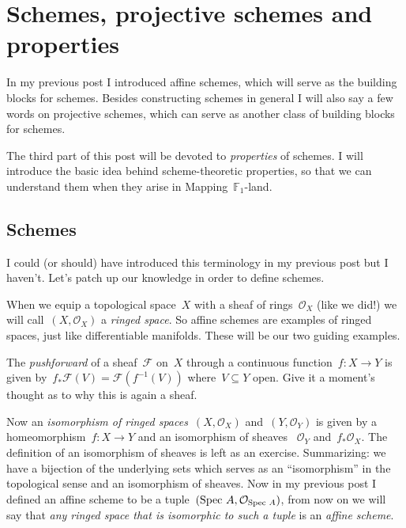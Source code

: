 \section{Schemes, projective schemes and properties}

In my previous post I introduced affine schemes, which will serve as the building blocks for schemes. Besides constructing schemes in general I will also say a few words on projective schemes, which can serve as another class of building blocks for schemes.

The third part of this post will be devoted to \emph{properties} of schemes. I will introduce the basic idea behind scheme-theoretic properties, so that we can understand them when they arise in \iftex\cite{mapping-fun}\fi\ifblog Mapping~$\mathbb{F}_1$-land\fi.

\subsection{Schemes}
I could (or should) have introduced this terminology in my previous post but I haven't. Let's patch up our knowledge in order to define schemes.

\begin{definition}
  When we equip a topological space~$X$ with a sheaf of rings~$\mathcal{O}_X$ (like we did!) we will call~$(X,\mathcal{O}_X)$ a \emph{ringed space}. So affine schemes are examples of ringed spaces, just like differentiable manifolds. These will be our two guiding examples.
\end{definition}

\begin{definition}
  The \emph{pushforward} of a sheaf~$\mathcal{F}$ on~$X$ through a continuous function~$f\colon X\to Y$ is given by~$f_\ast\mathcal{F}(V)=\mathcal{F}(f^{-1}(V))$ where~$V\subseteq Y$ open. Give it a moment's thought as to why this is again a sheaf.
\end{definition}

\begin{definition}
  Now an \emph{isomorphism of ringed spaces}~$(X,\mathcal{O}_X)$ and~$(Y,\mathcal{O}_Y)$ is given by a homeomorphism~$f\colon X\to Y$ and an isomorphism of sheaves ~$\mathcal{O}_Y$ and~$f_\ast\mathcal{O}_X$. The definition of an isomorphism of sheaves is left as an exercise. Summarizing: we have a bijection of the underlying sets which serves as an ``isomorphism'' in the topological sense and an isomorphism of sheaves. Now in my previous post I defined an affine scheme to be a tuple~$(\operatorname{Spec\,} A,\mathcal{O}_{\operatorname{Spec\,} A})$, from now on we will say that \emph{any ringed space that is isomorphic to such a tuple} is an \emph{affine scheme}.
\end{definition}


